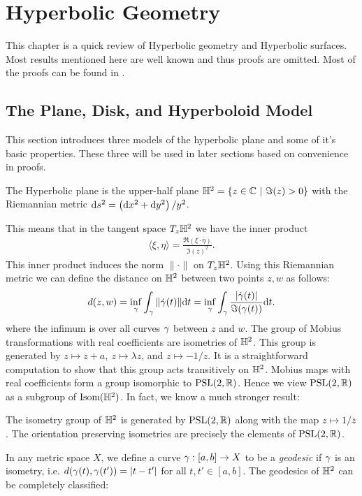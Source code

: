 \chapter{Hyperbolic Geometry}
%
This chapter is a quick review of Hyperbolic geometry and Hyperbolic surfaces. Most results mentioned here are well known and thus proofs are omitted. Most of the proofs can be found in \cite{katok, casson, buser}. 
\section{The Plane, Disk, and Hyperboloid Model}
This section introduces three models of the hyperbolic plane and some of it's basic properties. These three will be used in later sections based on convenience in proofs. 
\begin{definition}
  The Hyperbolic plane is the upper-half plane $\mathbb{H}^2 = \{z\in \mathbb{C}\ |\ \Im(z)>0\}$ with the Riemannian metric $\text{d} s^2= \left(\text{d} x^2 + \text{d} y^2\right)/y^2$. 
\end{definition}
This means that in the tangent space $T_z\mathbb{H}^2$ we have the inner product
\begin{align}
  \langle \xi, \eta \rangle = \frac{\Re(\xi\cdot\overline{\eta})}{\Im(z)^2}. 
\end{align}
This inner product induces the norm $\|\cdot\|$ on $T_z\mathbb{H}^2$. Using this Riemannian metric we can define the distance on $\mathbb{H}^2$ between two points $z,w$ as follows:
\begin{align}
  d(z,w) = \inf_{\gamma} \int_\gamma \|\dot{\gamma}(t)\| \text{d} t = \inf_{\gamma} \int_\gamma \frac{|\dot{\gamma}(t)|}{\Im(\gamma(t))} \text{d} t.
\end{align}
where the infimum is over all curves $\gamma$ between $z$ and $w$. The group of Mobius transformations with real coefficients are isometries of $\mathbb{H}^2$. This group is generated by $z\mapsto z+a,\ z\mapsto \lambda z$, and $z\mapsto -1/z$. It is a straightforward computation to show that this group acts transitively on $\mathbb{H}^2$. Mobius maps with real coefficients form a group isomorphic to $\text{PSL}(2,\mathbb{R})$. Hence we view $\text{PSL}(2,\mathbb{R})$ as a subgroup of $\text{Isom}(\mathbb{H}^2)$. In fact, we know a much stronger result:
\begin{proposition}
  The isometry group of $\mathbb{H}^2$ is generated by $\text{PSL}(2,\mathbb{R})$ along with the map $z\mapsto 1/\bar{z}$. The orientation preserving isometries are precisely the elements of $\text{PSL}(2,\mathbb{R})$.
\end{proposition}
In any metric space $X$, we define a curve $\gamma:[a,b]\to X$ to be a \textit{geodesic} if $\gamma$ is an isometry, i.e. $d(\gamma(t),\gamma(t')) = |t-t'|$ for all $t,t'\in [a,b]$. The geodesics of $\mathbb{H}^2$ can be completely classified:
